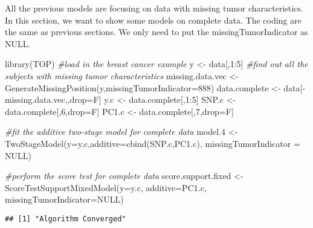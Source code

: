 \documentclass[11pt,]{article}
\newenvironment{Shaded}{\begin{snugshade}}{\end{snugshade}}
\newcommand{\AttributeTok}[1]{\textcolor[rgb]{0.77,0.63,0.00}{#1}}
\newcommand{\CommentTok}[1]{\textcolor[rgb]{0.56,0.35,0.01}{\textit{#1}}}
\newcommand{\ConstantTok}[1]{\textcolor[rgb]{0.00,0.00,0.00}{#1}}
\newcommand{\DecValTok}[1]{\textcolor[rgb]{0.00,0.00,0.81}{#1}}
\newcommand{\FloatTok}[1]{\textcolor[rgb]{0.00,0.00,0.81}{#1}}
\newcommand{\FunctionTok}[1]{\textcolor[rgb]{0.00,0.00,0.00}{#1}}
\newcommand{\NormalTok}[1]{#1}
\newcommand{\OtherTok}[1]{\textcolor[rgb]{0.56,0.35,0.01}{#1}}
\newcommand{\SpecialCharTok}[1]{\textcolor[rgb]{0.00,0.00,0.00}{#1}}
\begin{document}
All the previous models are focusing on data with missing tumor
characteristics. In this section, we want to show some models on
complete data. The coding are the same as previous sections. We only
need to put the missingTumorIndicator as NULL.

\begin{Shaded}
\begin{Highlighting}[]
\FunctionTok{library}\NormalTok{(TOP)}
\CommentTok{\#load in the breast cancer example}
\NormalTok{y }\OtherTok{\textless{}{-}}\NormalTok{ data[,}\DecValTok{1}\SpecialCharTok{:}\DecValTok{5}\NormalTok{]}
\CommentTok{\#find out all the subjects with missing tumor characteristics}
\NormalTok{missing.data.vec }\OtherTok{\textless{}{-}} \FunctionTok{GenerateMissingPosition}\NormalTok{(y,}\AttributeTok{missingTumorIndicator=}\DecValTok{888}\NormalTok{)}
\NormalTok{data.complete }\OtherTok{\textless{}{-}}\NormalTok{ data[}\SpecialCharTok{{-}}\NormalTok{missing.data.vec,,drop}\OtherTok{=}\NormalTok{F]}
\NormalTok{y.c }\OtherTok{\textless{}{-}}\NormalTok{ data.complete[,}\DecValTok{1}\SpecialCharTok{:}\DecValTok{5}\NormalTok{]}
\NormalTok{SNP.c }\OtherTok{\textless{}{-}}\NormalTok{ data.complete[,}\DecValTok{6}\NormalTok{,drop}\OtherTok{=}\NormalTok{F]}
\NormalTok{PC1.c }\OtherTok{\textless{}{-}}\NormalTok{ data.complete[,}\DecValTok{7}\NormalTok{,drop}\OtherTok{=}\NormalTok{F]}

\CommentTok{\#fit the additive two{-}stage model for complete data}
\NormalTok{model}\FloatTok{.4} \OtherTok{\textless{}{-}} \FunctionTok{TwoStageModel}\NormalTok{(}\AttributeTok{y=}\NormalTok{y.c,}\AttributeTok{additive=}\FunctionTok{cbind}\NormalTok{(SNP.c,PC1.c),}
                         \AttributeTok{missingTumorIndicator =} \ConstantTok{NULL}\NormalTok{)}


\CommentTok{\#perform the score test for complete data}
\NormalTok{score.support.fixed }\OtherTok{\textless{}{-}} \FunctionTok{ScoreTestSupportMixedModel}\NormalTok{(}\AttributeTok{y=}\NormalTok{y.c,}
                                                  \AttributeTok{additive=}\NormalTok{PC1.c,}
                                                  \AttributeTok{missingTumorIndicator=}\ConstantTok{NULL}\NormalTok{)}
\end{Highlighting}
\end{Shaded}

\begin{verbatim}
## [1] "Algorithm Converged"
\end{verbatim}
\end{document}
